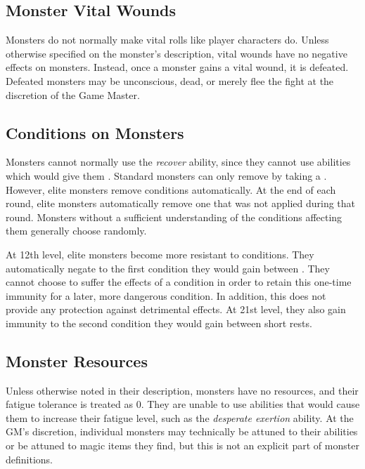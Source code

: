         \subsection{Monster Vital Wounds}
            Monsters do not normally make vital rolls like player characters do.
            Unless otherwise specified on the monster's description, vital wounds have no negative effects on monsters.
            Instead, once a monster gains a vital wound, it is defeated.
            Defeated monsters may be unconscious, dead, or merely flee the fight at the discretion of the Game Master.

        \subsection{Conditions on Monsters}\label{Conditions on Monsters}
            Monsters cannot normally use the \textit{recover} ability, since they cannot use abilities which would give them .
            Standard monsters can only remove  by taking a .
            However, elite monsters remove conditions automatically.
            At the end of each round, elite monsters automatically remove one  that was not applied during that round.
            Monsters without a sufficient understanding of the conditions affecting them generally choose randomly.

             At 12th level, elite monsters become more resistant to conditions.
            They automatically negate to the first condition they would gain between .
            They cannot choose to suffer the effects of a condition in order to retain this one-time immunity for a later, more dangerous condition.
            In addition, this does not provide any protection against detrimental  effects.
            At 21st level, they also gain immunity to the second condition they would gain between short rests.

        \subsection{Monster Resources}
            Unless otherwise noted in their description, monsters have no resources, and their fatigue tolerance is treated as 0.
            They are unable to use abilities that would cause them to increase their fatigue level, such as the \textit{desperate exertion} ability.
            At the GM's discretion, individual monsters may technically be attuned to their abilities or be attuned to magic items they find, but this is not an explicit part of monster definitions.

